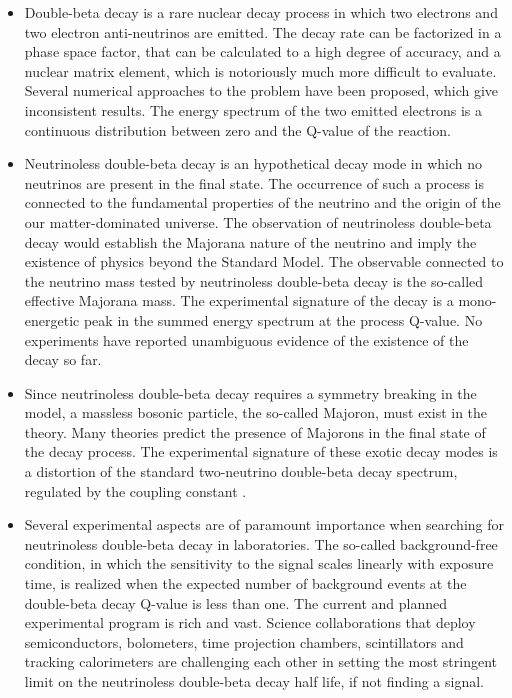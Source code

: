 \chapsummary
\begin{itemize}
  \item Double-beta decay is a rare nuclear decay process in which two electrons and two
    electron anti-neutrinos are emitted. The decay rate can be factorized in a phase space
    factor, that can be calculated to a high degree of accuracy, and a nuclear matrix
    element, which is notoriously much more difficult to evaluate. Several numerical
    approaches to the problem have been proposed, which give inconsistent results. The
    energy spectrum of the two emitted electrons is a continuous distribution between zero
    and the Q-value of the reaction.
  \item Neutrinoless double-beta decay is an hypothetical decay mode in which no neutrinos
    are present in the final state. The occurrence of such a process is connected to the
    fundamental properties of the neutrino and the origin of the our matter-dominated
    universe. The observation of neutrinoless double-beta decay would establish the
    Majorana nature of the neutrino and imply the existence of physics beyond the Standard
    Model. The observable connected to the neutrino mass tested by neutrinoless
    double-beta decay is the so-called effective Majorana mass. The experimental
    signature of the decay is a mono-energetic peak in the summed energy spectrum at the
    process Q-value. No experiments have reported unambiguous evidence of the existence of
    the decay so far.
  \item Since neutrinoless double-beta decay requires a symmetry breaking in the model, a
    massless bosonic particle, the so-called Majoron, must exist in the theory. Many
    theories predict the presence of Majorons in the final state of the decay process.
    The experimental signature of these exotic decay modes is a distortion of the standard
    two-neutrino double-beta decay spectrum, regulated by the coupling constant \ga.
  \item Several experimental aspects are of paramount importance when searching for
    neutrinoless double-beta decay in laboratories. The so-called background-free
    condition, in which the sensitivity to the signal scales linearly with exposure time,
    is realized when the expected number of background events at the double-beta decay
    Q-value is less than one. The current and planned experimental program is rich and
    vast. Science collaborations that deploy semiconductors, bolometers, time projection
    chambers, scintillators and tracking calorimeters are challenging each other in
    setting the most stringent limit on the neutrinoless double-beta decay half life, if
    not finding a signal.
\end{itemize}

